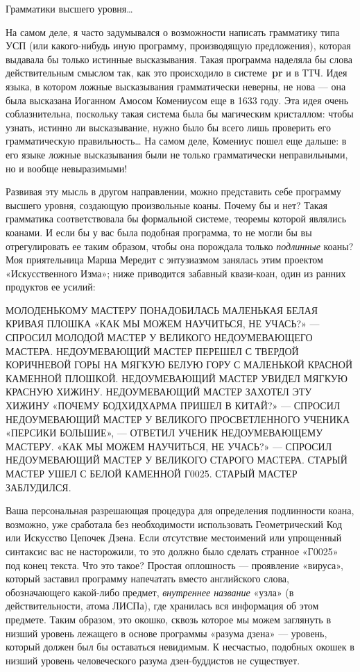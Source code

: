 Грамматики высшего уровня\ldots{}

На самом деле, я часто задумывался о возможности написать грамматику типа УСП (или какого-нибудь иную программу, производящую предложения), которая выдавала бы только истинные высказывания. Такая программа наделяла бы слова действительным смыслом так, как это происходило в системе~\textbf{pr} и в ТТЧ. Идея языка, в котором ложные высказывания грамматически неверны, не нова --- она была высказана Иоганном Амосом Комениусом еще в 1633 году. Эта идея очень соблазнительна, поскольку такая система была бы магическим кристаллом: чтобы узнать, истинно ли высказывание, нужно было бы всего лишь проверить его грамматическую правильность\ldots{} На самом деле, Комениус пошел еще дальше: в его языке ложные высказывания были не только грамматически неправильными, но и вообще невыразимыми!

Развивая эту мысль в другом направлении, можно представить себе программу высшего уровня, создающую произвольные коаны. Почему бы и нет? Такая грамматика соответствовала бы формальной системе, теоремы которой являлись коанами. И если бы у вас была подобная программа, то не могли бы вы отрегулировать ее таким образом, чтобы она порождала только \emph{подлинные} коаны? Моя приятельница Марша Мередит с энтузиазмом занялась этим проектом «Искусственного Изма»; ниже приводится забавный квази-коан, один из ранних продуктов ее усилий:

МОЛОДЕНЬКОМУ МАСТЕРУ ПОНАДОБИЛАСЬ МАЛЕНЬКАЯ БЕЛАЯ КРИВАЯ ПЛОШКА «КАК МЫ МОЖЕМ НАУЧИТЬСЯ, НЕ УЧАСЬ?» --- СПРОСИЛ МОЛОДОЙ МАСТЕР У ВЕЛИКОГО НЕДОУМЕВАЮЩЕГО МАСТЕРА. НЕДОУМЕВАЮЩИЙ МАСТЕР ПЕРЕШЕЛ С ТВЕРДОЙ КОРИЧНЕВОЙ ГОРЫ НА МЯГКУЮ БЕЛУЮ ГОРУ С МАЛЕНЬКОЙ КРАСНОЙ КАМЕННОЙ ПЛОШКОЙ. НЕДОУМЕВАЮЩИЙ МАСТЕР УВИДЕЛ МЯГКУЮ КРАСНУЮ ХИЖИНУ. НЕДОУМЕВАЮЩИЙ МАСТЕР ЗАХОТЕЛ ЭТУ ХИЖИНУ «ПОЧЕМУ БОДХИДХАРМА ПРИШЕЛ В КИТАЙ?» --- СПРОСИЛ НЕДОУМЕВАЮЩИЙ МАСТЕР У ВЕЛИКОГО ПРОСВЕТЛЕННОГО УЧЕНИКА «ПЕРСИКИ БОЛЬШИЕ», --- ОТВЕТИЛ УЧЕНИК НЕДОУМЕВАЮЩЕМУ МАСТЕРУ. «КАК МЫ МОЖЕМ НАУЧИТЬСЯ, НЕ УЧАСЬ?» --- СПРОСИЛ НЕДОУМЕВАЮЩИЙ МАСТЕР У ВЕЛИКОГО СТАРОГО МАСТЕРА. СТАРЫЙ МАСТЕР УШЕЛ С БЕЛОЙ КАМЕННОЙ Г0025. СТАРЫЙ МАСТЕР ЗАБЛУДИЛСЯ.

Ваша персональная разрешающая процедура для определения подлинности коана, возможно, уже сработала без необходимости использовать Геометрический Код или Искусство Цепочек Дзена. Если отсутствие местоимений или упрощенный синтаксис вас не насторожили, то это должно было сделать странное «Г0025» под конец текста. Что это такое? Простая оплошность --- проявление «вируса», который заставил программу напечатать вместо английского слова, обозначающего какой-либо предмет, \emph{внутреннее название} «узла» (в действительности, атома ЛИСПа), где хранилась вся информация об этом предмете. Таким образом, это окошко, сквозь которое мы можем заглянуть в низший уровень лежащего в основе программы «разума дзена» --- уровень, который должен был бы оставаться невидимым. К несчастью, подобных окошек в низший уровень человеческого разума дзен-буддистов не существует.

